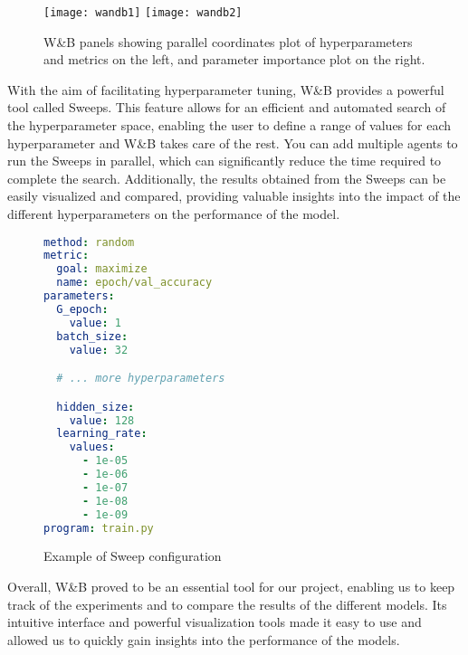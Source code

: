 \begin{figure}[H]
  \centering
  \texttt{[image: wandb1]}
  \texttt{[image: wandb2]}
  \caption{W\&B panels showing parallel coordinates plot of hyperparameters and metrics on the left, and parameter importance plot on the right.}
\end{figure}


With the aim of facilitating hyperparameter tuning, W\&B provides a powerful tool called Sweeps.
This feature allows for an efficient and automated search of the hyperparameter space, enabling the user to define a range of values for each hyperparameter and W\&B takes care of the rest.
You can add multiple agents to run the Sweeps in parallel, which can significantly reduce the time required to complete the search.
Additionally, the results obtained from the Sweeps can be easily visualized and compared, providing valuable insights into the impact of the different hyperparameters on the performance of the model.

\begin{figure}[H]
\begin{lstlisting}[language=yaml]
method: random
metric:
  goal: maximize
  name: epoch/val_accuracy
parameters:
  G_epoch:
    value: 1
  batch_size:
    value: 32

  # ... more hyperparameters

  hidden_size:
    value: 128
  learning_rate:
    values:
      - 1e-05
      - 1e-06
      - 1e-07
      - 1e-08
      - 1e-09
program: train.py
\end{lstlisting}
\caption{Example of Sweep configuration}
\end{figure}

Overall, W\&B proved to be an essential tool for our project, enabling us to keep track of the experiments and to compare the results of the different models. 
Its intuitive interface and powerful visualization tools made it easy to use and allowed us to quickly gain insights into the performance of the models.




